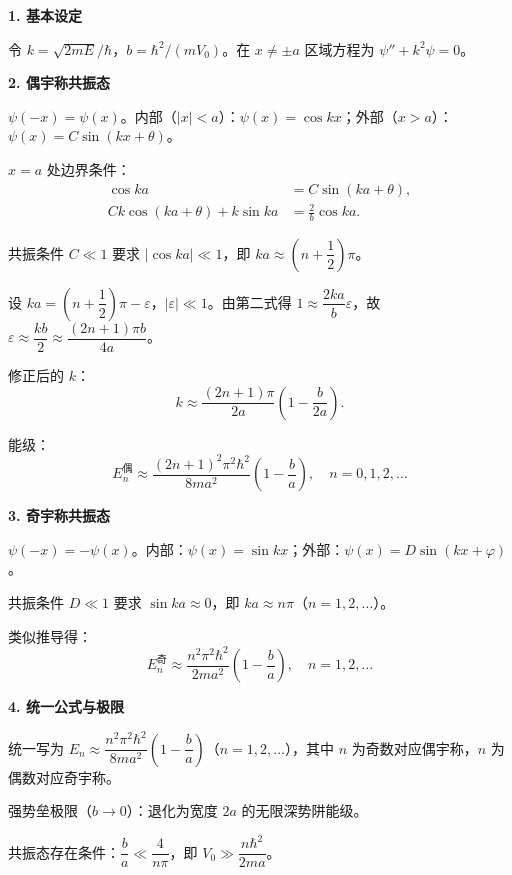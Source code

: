 \begin{derivationbox}[标准解题过程]
\textbf{1. 基本设定}

令 $k=\sqrt{2mE}/\hbar$，$b=\hbar^2/(mV_0)$。在 $x\neq\pm a$ 区域方程为 $\psi''+k^2\psi=0$。

\textbf{2. 偶宇称共振态}

$\psi(-x)=\psi(x)$。内部（$|x|<a$）：$\psi(x)=\cos kx$；外部（$x>a$）：$\psi(x)=C\sin(kx+\theta)$。

$x=a$ 处边界条件：
\begin{align*}
\cos ka&=C\sin(ka+\theta),\\
Ck\cos(ka+\theta)+k\sin ka&=\frac{2}{b}\cos ka.
\end{align*}

共振条件 $C\ll1$ 要求 $|\cos ka|\ll1$，即 $ka\approx\left(n+\dfrac{1}{2}\right)\pi$。

设 $ka=\left(n+\dfrac{1}{2}\right)\pi-\varepsilon$，$|\varepsilon|\ll1$。由第二式得 $1\approx\dfrac{2ka}{b}\varepsilon$，故 $\varepsilon\approx\dfrac{kb}{2}\approx\dfrac{(2n+1)\pi b}{4a}$。

修正后的 $k$：
\[
k\approx\frac{(2n+1)\pi}{2a}\left(1-\frac{b}{2a}\right).
\]

能级：
\begin{equation}
\boxed{E_n^{\text{偶}}\approx\frac{(2n+1)^2\pi^2\hbar^2}{8ma^2}\left(1-\frac{b}{a}\right),\quad n=0,1,2,\ldots}
\end{equation}

\textbf{3. 奇宇称共振态}

$\psi(-x)=-\psi(x)$。内部：$\psi(x)=\sin kx$；外部：$\psi(x)=D\sin(kx+\varphi)$。

共振条件 $D\ll1$ 要求 $\sin ka\approx0$，即 $ka\approx n\pi$（$n=1,2,\ldots$）。

类似推导得：
\begin{equation}
\boxed{E_n^{\text{奇}}\approx\frac{n^2\pi^2\hbar^2}{2ma^2}\left(1-\frac{b}{a}\right),\quad n=1,2,\ldots}
\end{equation}

\textbf{4. 统一公式与极限}

统一写为 $E_n\approx\dfrac{n^2\pi^2\hbar^2}{8ma^2}\left(1-\dfrac{b}{a}\right)$（$n=1,2,\ldots$），其中 $n$ 为奇数对应偶宇称，$n$ 为偶数对应奇宇称。

强势垒极限（$b\to0$）：退化为宽度 $2a$ 的无限深势阱能级。

共振态存在条件：$\dfrac{b}{a}\ll\dfrac{4}{n\pi}$，即 $V_0\gg\dfrac{n\hbar^2}{2ma}$。
\end{derivationbox}

